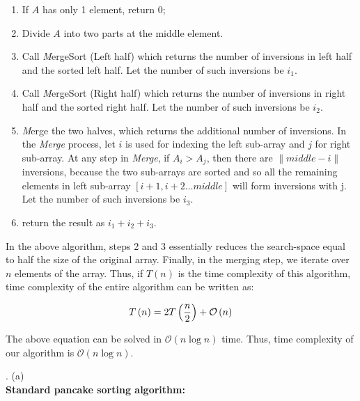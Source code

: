 \documentclass[assign]{article}
\begin{document}
\begin{enumerate}
   \item If $A$ has only 1 element, return 0;
   \item Divide  $A$ into  two parts at the middle element.
   \item Call {\emph MergeSort (Left half)} which returns the number of inversions in left half and the sorted left half. Let the number of such inversions be $i_1$.
   \item Call {\emph MergeSort (Right half)} which returns the number of inversions in right half and the sorted right half. Let the number of such inversions be $i_2$.
   \item {\emph Merge} the two halves, which returns the additional number of inversions. In the {\em Merge} process, let $i$ is used for indexing the left sub-array and $j$ for right sub-array. At any step in {\em Merge}, if $A_i > A_j$, then there are $\| middle - i\| $ inversions, because the two sub-arrays are sorted and so all the remaining elements in left sub-array $\left [ i+1, i+2 \dots middle \right ]$ will form inversions with j. Let the number of such inversions be $i_3$.  
   \item return the result as $i_1 + i_2 + i_3$. 
\end{enumerate}

\noindent  In the above algorithm, steps 2 and 3 essentially reduces the search-space equal to half the size of the original array. Finally, in the merging step, we iterate over $n$ elements of the array. Thus, if $T\left(n\right)$ is the time complexity of this algorithm, time complexity of the entire algorithm can be written as:

\begin{equation}
  T\left( n\right) = 2T\left( \frac{n}{2} \right) + \mathcal{O} \left( n\right) \notag
\end{equation} 

\noindent The above equation can be solved in $\mathcal{O} \left( n\log n\right)$ time. Thus, time complexity of our algorithm is $\mathcal{O} \left ( n \log n\right )$.

\vspace{10pt}

. (a) \\
{\bf Standard pancake sorting algorithm:}
\end{document}
